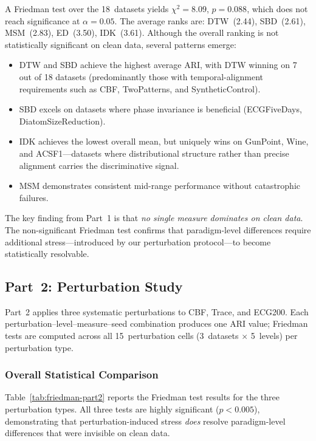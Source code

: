 A Friedman test over the 18~datasets yields $\chi^2 = 8.09$, $p = 0.088$, which does not reach significance at $\alpha = 0.05$.
The average ranks are: DTW~(2.44), SBD~(2.61), MSM~(2.83), ED~(3.50), IDK~(3.61).
Although the overall ranking is not statistically significant on clean data, several patterns emerge:
\begin{itemize}
    \item DTW and SBD achieve the highest average ARI, with DTW winning on 7 out of 18 datasets (predominantly those with temporal-alignment requirements such as CBF, TwoPatterns, and SyntheticControl).
    \item SBD excels on datasets where phase invariance is beneficial (ECGFiveDays, DiatomSizeReduction).
    \item IDK achieves the lowest overall mean, but uniquely wins on GunPoint, Wine, and ACSF1---datasets where distributional structure rather than precise alignment carries the discriminative signal.
    \item MSM demonstrates consistent mid-range performance without catastrophic failures.
\end{itemize}

The key finding from Part~1 is that \emph{no single measure dominates on clean data}.
The non-significant Friedman test confirms that paradigm-level differences require additional stress---introduced by our perturbation protocol---to become statistically resolvable.


\subsection{Part~2: Perturbation Study}\label{sec:results-part2}

Part~2 applies three systematic perturbations to CBF, Trace, and ECG200.
Each perturbation--level--measure--seed combination produces one ARI value; Friedman tests are computed across all 15~perturbation cells (3~datasets $\times$ 5~levels) per perturbation type.

\subsubsection{Overall Statistical Comparison}\label{sec:results-friedman}

Table~\ref{tab:friedman-part2} reports the Friedman test results for the three perturbation types.
All three tests are highly significant ($p < 0.005$), demonstrating that perturbation-induced stress \emph{does} resolve paradigm-level differences that were invisible on clean data.

